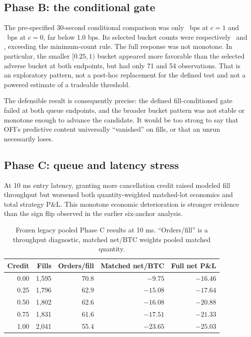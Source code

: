 \subsection{Phase B: the conditional gate}

The pre-specified 30-second conditional comparison was only
\OFIConditionalQcOne\ bps at $c=1$ and \OFIConditionalQcZero\ bps at $c=0$,
far below 1.0 bps. Its selected bucket counts were respectively
\OFIMinCountQcOne\ and \OFIMinCountQcZero, exceeding the minimum-count rule.
The full response was not monotone. In particular, the smaller
$[0.25,1)$ bucket appeared more favorable than the selected adverse bucket at
both endpoints, but had only 71 and 54 observations. That is an exploratory
pattern, not a post-hoc replacement for the defined test and not a powered
estimate of a tradeable threshold.

The defensible result is consequently precise: the defined fill-conditioned
gate failed at both queue endpoints, and the broader bucket pattern was not
stable or monotone enough to advance the candidate. It would be too strong to
say that OFI's predictive content universally ``vanished'' on fills, or that an
unrun  necessarily loses.

\subsection{Phase C: queue and latency stress}

At 10 ms entry latency, granting more cancellation credit raised modeled fill
throughput but worsened both quantity-weighted matched-lot economics and total
strategy P\&L. This monotone economic deterioration is stronger evidence than
the sign flip observed in the earlier six-anchor analysis.

\begin{table}[H]
\centering
\caption{Frozen legacy pooled Phase C results at 10 ms. ``Orders/fill'' is a throughput
diagnostic, matched net/BTC weights pooled matched quantity.}
\label{tab:queue-stress}
\begin{tabular}{@{}rrrrr@{}}
\toprule
Credit & Fills & Orders/fill & Matched net/BTC & Full net P\&L \\
\midrule
0.00 & 1,595 & 70.8 &  $-9.75$ & $-16.46$ \\
0.25 & 1,796 & 62.9 & $-15.08$ & $-17.64$ \\
0.50 & 1,802 & 62.6 & $-16.08$ & $-20.88$ \\
0.75 & 1,831 & 61.6 & $-17.51$ & $-21.33$ \\
1.00 & 2,041 & 55.4 & $-23.65$ & $-25.03$ \\
\bottomrule
\end{tabular}
\end{table}


